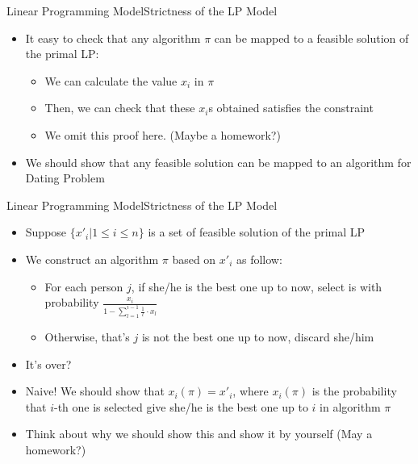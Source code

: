 \documentclass{beamer}
\begin{document}
\begin{frame}{Linear Programming Model}{Strictness of the LP Model}
\begin{itemize}
	\item It easy to check that any algorithm $\pi$ can be mapped to a feasible solution of the primal LP:
	\begin{itemize}
				\item We can calculate the value $x_i$ in $\pi$ 
				\item Then, we can check that these $x_i$s obtained satisfies the constraint 
				\item We omit this proof here. (Maybe a homework?)
			\end{itemize}
	\item We should show that any feasible solution can be mapped to an algorithm for Dating Problem
\end{itemize}
\end{frame}

\begin{frame}{Linear Programming Model}{Strictness of the LP Model}
\begin{itemize}
		\item Suppose $\{x'_i| 1\leq i\leq n\}$ is a set of feasible solution of the primal LP
		\item We construct an algorithm $\pi$ based on $x'_i$ as follow:
			\begin{itemize}
			\item For each person $j$, if she/he is the best one up to now, select is with probability $\frac{x_i}{1-\sum_{l = 1}^{i-1}\frac{1}{l}\cdot x_l}$
		    \item Otherwise, that's $j$ is not the best one up to now, discard she/him
			\end{itemize}
	\item It's over?
	\item Naive! We should show that $x_i(\pi) = x'_i$, where $x_i(\pi)$ is the probability that $i$-th one is selected give she/he is the best one up to $i$ in algorithm $\pi$
	\item Think about why we should show this and show it by yourself (May a homework?)
\end{itemize}
\end{frame}
\end{document}
